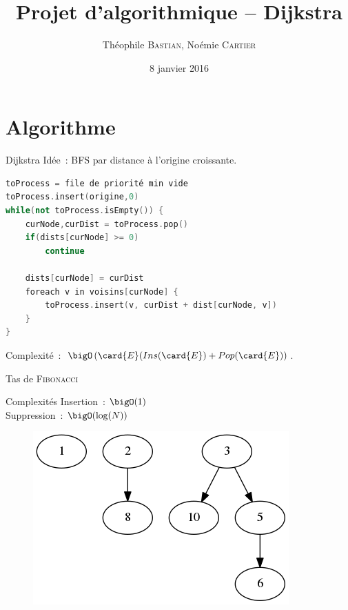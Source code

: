 \documentclass[11pt]{beamer}
\author{Théophile \textsc{Bastian}, Noémie \textsc{Cartier}}
\title{Projet d'algorithmique -- Dijkstra}
\date{8 janvier 2016}
\begin{document}
\begin{frame}
\titlepage
\end{frame}


\section{Algorithme}

\begin{frame}[fragile]{Dijkstra}
\alert{Idée~:} BFS par distance à l'origine croissante.

\vspace{1em}
\begin{lstlisting}[language=C++]
toProcess = file de priorité min vide
toProcess.insert(origine,0)
while(not toProcess.isEmpty()) {
	curNode,curDist = toProcess.pop()
	if(dists[curNode] >= 0)
		continue

	dists[curNode] = curDist
	foreach v in voisins[curNode] {
		toProcess.insert(v, curDist + dist[curNode, v])
	}
}
\end{lstlisting}

\alert{Complexité~:} $\bigO\left(\card{E} (Ins(\card{E}) + Pop(\card{E})\right)$.

\end{frame}

\begin{frame}{Tas de \textsc{Fibonacci}}
\begin{block}{Complexités}
Insertion~: $\bigO(1)$\\
Suppression~: $\bigO(\log(N))$
\end{block}

\vspace{1em}
\begin{figure}[H]
\includegraphics[width=0.6\linewidth]{fiboheap.png}
\end{figure}
\end{frame}
\end{document}
